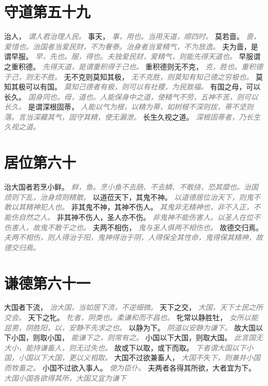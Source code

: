 \documentclass[a4paper,zihao=-4,oneside,landscape,UTF8]{ctexart}
\newcommand{\zhushi}[1]{\scriptsize{\textit{\textcolor{gray}{#1}}}\normalsize}
\begin{document}
\section{守道第五十九}

治人，
\zhushi{谓人君治理人民。}
事天，
\zhushi{事，用也。当用天道，顺四时。}
莫若啬。
\zhushi{啬，爱惜也。治国者当爱民财，不为奢泰。治身者当爱精气，不为放逸。}
夫为啬，是谓早服。
\zhushi{早，先也。服，得也。夫独爱民财，爱精气，则能先得天道也。}
早服谓之重积德。
\zhushi{先得天道，是谓重积得于己也。}
重积德则无不克，
\zhushi{克，胜也。重积德于己，则无不胜。}
无不克则莫知其极，
\zhushi{无不克胜，则莫知有知己德之穷极也。}
莫知其极可以有国。
\zhushi{莫知己德者有极，则可以有社稷，为民致福。}
有国之母，可以长久。
\zhushi{国身同也。母，道也。人能保身中之道，使精气不劳，五神不苦，则可以长久。}
是谓深根固蒂，
\zhushi{人能以气为根，以精为蒂，如树根不深则拔，蒂不坚则落。言当深藏其气，固守其精，使无漏泄。}
长生久视之道。
\zhushi{深根固蒂者，乃长生久视之道。}


\section{居位第六十}

治大国者若烹小鲜。
\zhushi{鲜，鱼。烹小鱼不去肠、不去鳞、不敢挠，恐其糜也。治国烦则下乱，治身烦则精散。}
以道莅天下，其鬼不神。
\zhushi{以道德居位治天下，则鬼不敢以其精神犯人也。}
非其鬼不神，其神不伤人。
\zhushi{其鬼非无精神也，非不入正，不能伤自然之人。}
非其神不伤人，圣人亦不伤。
\zhushi{非鬼神不能伤害人。以圣人在位不伤害人，故鬼不敢干之也。}
夫两不相伤，
\zhushi{鬼与圣人俱两不相伤也。}
故德交归焉。
\zhushi{夫两不相伤，则人得治于阳，鬼神得治于阴，人得保全其性命，鬼得保其精神，故德交归焉。}


\section{谦德第六十一}

大国者下流，
\zhushi{治大国，当如居下流，不逆细微。}
天下之交，
\zhushi{大国，天下士民之所交会。}
天下之牝。
\zhushi{牝者，阴类也。柔谦和而不昌也。}
牝常以静胜牡，
\zhushi{女所以能屈男，阴胜阳，以，安静不先求之也。}
以静为下。
\zhushi{阴道以安静为谦下。}
故大国以下小国，则取小国，
\zhushi{能谦下之，则常有之。}
小国以下大国，则取大国。
\zhushi{此言国无大小，能持谦畜人，则无过失也。}
故或下以取，或下而取。
\zhushi{下者谓大国以下小国，小国以下大国，更以义相取。}
大国不过欲兼畜人，
\zhushi{大国不失下，则兼并小国而牧畜之。}
小国不过欲入事人。
\zhushi{使为臣仆。}
夫两者各得其所欲，大者宜为下。
\zhushi{大国小国各欲得其所，大国又宜为谦下}
\end{document}
